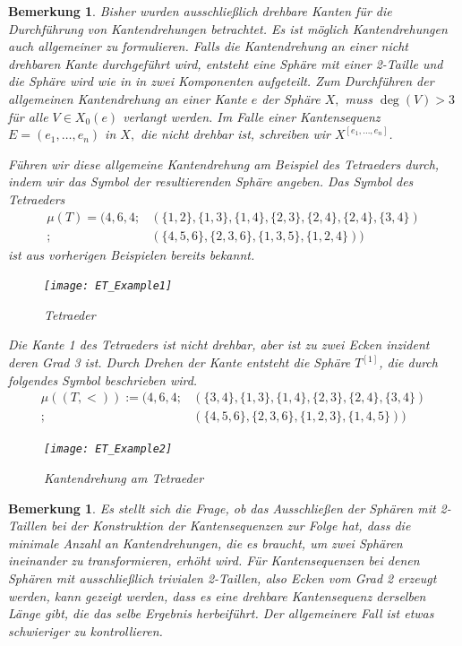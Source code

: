 \documentclass[12pt,titlepage,twoside,cleardoublepage]{article}
\theoremstyle{nummermitklammern}
\newtheorem{bemerkung}[temp]{Bemerkung}
\newtheorem{bemerkung}[zahl]{Bemerkung}
\numberwithin{equation}{section}
\begin{document}
\begin{bemerkung}
Bisher wurden ausschließlich drehbare Kanten für die Durchführung von Kantendrehungen betrachtet. Es ist möglich Kantendrehungen auch allgemeiner zu formulieren. Falls die Kantendrehung an einer nicht drehbaren Kante durchgeführt wird, entsteht eine Sphäre mit einer 2-Taille und die Sphäre wird wie in  in zwei Komponenten aufgeteilt.  Zum Durchführen der allgemeinen Kantendrehung an einer Kante $e$ der Sphäre $X,$ muss $\deg(V)>3$ für alle $V\in X_0(e)$ verlangt werden. Im Falle einer Kantensequenz $E=(e_1,\ldots,e_n)$ in $X,$ die nicht drehbar ist, schreiben wir $X^{[e_1,\ldots,e_n]}$.

 Führen wir diese allgemeine Kantendrehung am Beispiel des Tetraeders durch, indem wir das Symbol der resultierenden Sphäre angeben. Das Symbol des Tetraeders
\begin{align*}
\mu(T)=(4,6,4;&(\{1,2\}, \{1,3\},\{1,4\},\{2,3\},\{2,4\},\{2,4\},\{3,4\})\\
;&(\{4,5,6\},\{2,3,6\},\{1,3,5\},\{1,2,4\}))
\end{align*} ist aus vorherigen Beispielen bereits bekannt.
\begin{figure}[H]
\begin{center}
\texttt{[image: ET\_Example1]}
\end{center}
\caption{Tetraeder}
\end{figure}
Die Kante 1 des Tetraeders ist nicht drehbar, aber ist zu zwei Ecken inzident deren Grad 3 ist. Durch Drehen der Kante entsteht die Sphäre $T^{[1]}$, die durch folgendes Symbol beschrieben wird.
\begin{align*}
\mu ((T,<)):=(4,6,4;&(\{3,4\},\{1,3\},\{1,4\},\{2,3\},\{2,4\},\{3,4\})\\
;&(\{4,5,6\},\{2,3,6\},\{1,2,3\},\{1,4,5\}))
\end{align*}
\begin{figure}[H]
\begin{center}
\texttt{[image: ET\_Example2]}
\end{center}
\caption{Kantendrehung am Tetraeder}
\end{figure}

\end{bemerkung}

\begin{bemerkung}
Es stellt sich die Frage, ob das Ausschließen der Sphären mit 2-Taillen bei der Konstruktion der Kantensequenzen zur Folge hat, dass die minimale Anzahl an Kantendrehungen, die es braucht, um zwei Sphären ineinander zu transformieren, erhöht wird. Für Kantensequenzen bei denen Sphären mit ausschließlich trivialen 2-Taillen, also Ecken vom Grad 2 erzeugt werden, kann gezeigt werden, dass es eine drehbare Kantensequenz derselben Länge gibt, die das selbe Ergebnis herbeiführt. Der allgemeinere Fall ist etwas schwieriger zu kontrollieren.
\end{bemerkung}
\end{document}
